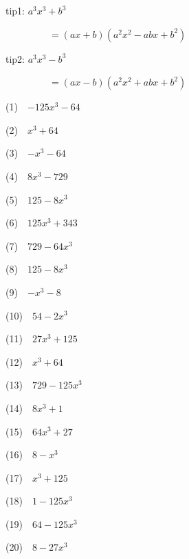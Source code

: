 \documentclass[a4j,twocolumn,10pt,fleqn]{jarticle}
\begin{document}
tip1: $a^{3} x^{3} + b^{3}$

~~~~~~~~~$=\left(a x + b\right) \left(a^{2} x^{2} - a b x + b^{2}\right)$


tip2: $a^{3} x^{3} - b^{3}$

~~~~~~~~~$=\left(a x - b\right) \left(a^{2} x^{2} + a b x + b^{2}\right)$


(1)~~$- 125 x^{3} - 64$

(2)~~$x^{3} + 64$

(3)~~$- x^{3} - 64$

(4)~~$8 x^{3} - 729$

(5)~~$125 - 8 x^{3}$

(6)~~$125 x^{3} + 343$

(7)~~$729 - 64 x^{3}$

(8)~~$125 - 8 x^{3}$

(9)~~$- x^{3} - 8$

(10)~~$54 - 2 x^{3}$

(11)~~$27 x^{3} + 125$

(12)~~$x^{3} + 64$

(13)~~$729 - 125 x^{3}$

(14)~~$8 x^{3} + 1$

(15)~~$64 x^{3} + 27$

(16)~~$8 - x^{3}$

(17)~~$x^{3} + 125$

(18)~~$1 - 125 x^{3}$

(19)~~$64 - 125 x^{3}$

(20)~~$8 - 27 x^{3}$
\end{document}
